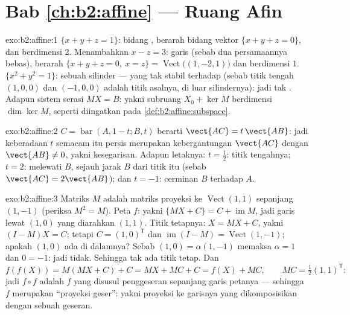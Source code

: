 \section*{Bab \ref{ch:b2:affine} --- Ruang Afin}

\begin{solution}{exo:b2:affine:1}
$\{x + y + z = 1\}$: bidang , berarah bidang vektor $\{x
+ y + z = 0\}$, dan berdimensi $2$. Menambahkan $x - z = 3$: garis 
(sebab dua persamaannya bebas), berarah $\{x + y + z = 0,\ x = z\}
= \operatorname{Vect}\bigl((1, -2, 1)\bigr)$ dan berdimensi $1$. $\{x^2
+ y^2 = 1\}$: sebuah silinder --- yang tak stabil terhadap  (sebab
titik tengah $(1,0,0)$ dan $(-1,0,0)$ adalah titik asalnya, di luar
silindernya): jadi tak . Adapun sistem serasi $MX = B$: yakni subruang
 $X_0 + \ker M$ berdimensi $\dim\ker M$, seperti diingatkan pada
\cref{def:b2:affine:subspace}.
\end{solution}

\begin{solution}{exo:b2:affine:2}
$C = \operatorname{bar}(A, 1-t; B, t)$ berarti $\vect{AC} =
t\,\vect{AB}$: jadi keberadaan $t$ semacam itu persis merupakan kebergantungan
$\vect{AC}$ dengan $\vect{AB} \neq 0$, yakni kesegarisan. Adapun letaknya: $t
= \frac12$: titik tengahnya; $t = 2$: melewati $B$, sejauh jarak $B$ dari
titik itu (sebab $\vect{AC} = 2\vect{AB}$); dan $t = -1$: cerminan $B$
terhadap $A$.
\end{solution}

\begin{solution}{exo:b2:affine:3}
Matriks $M$ adalah matriks proyeksi ke $\operatorname{Vect}(1,1)$ sepanjang
$(1,-1)$ (periksa $M^2 = M$). Peta $f$: yakni $\{MX + C\} = C +
\operatorname{im} M$, jadi garis  lewat $(1,0)$ yang diarahkan
$(1,1)$. Titik tetapnya: $X = MX + C$, yakni $(I - M)X = C$; tetapi $C =
(1, 0)^{\mathsf T}$ dan $\operatorname{im}(I - M) =
\operatorname{Vect}(1,-1)$; apakah $(1,0)$ ada di dalamnya? Sebab $(1, 0) =
\alpha(1,-1)$ memaksa $\alpha = 1$ dan $0 = -1$: jadi tidak. Sehingga tak ada titik
tetap. Dan
\[
f(f(X)) = M(MX + C) + C = MX + MC + C = f(X) + MC,
\qquad MC = \tfrac12(1,1)^{\mathsf T} :
\]
jadi $f\circ f$ adalah $f$ yang disusul penggeseran sepanjang garis petanya
--- sehingga $f$ merupakan ``proyeksi geser'': yakni proyeksi ke garisnya
yang dikomposisikan dengan sebuah geseran.
\end{solution}

